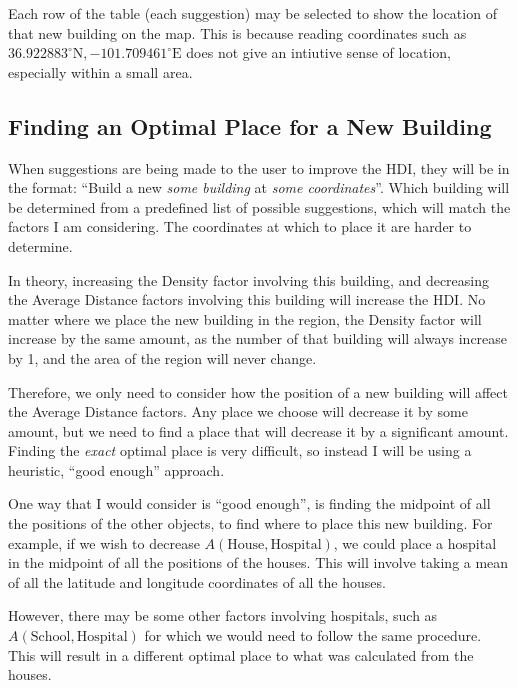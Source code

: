 \documentclass[12pt]{report}
\begin{document}
Each row of the table (each suggestion) may be selected to show the location of that new building on the map. This is because reading coordinates such as $36.922883^{\circ}\text{N},-101.709461^{\circ}\text{E}$ does not give an intiutive sense of location, especially within a small area.

\subsection{Finding an Optimal Place for a New Building}\label{sec:optimalPlace}
When suggestions are being made to the user to improve the HDI, they will be in the format: ``Build a new \textit{some building} at \textit{some coordinates}''. Which building will be determined from a predefined list of possible suggestions, which will match the factors I am considering. The coordinates at which to place it are harder to determine.

In theory, increasing the Density factor involving this building, and decreasing the Average Distance factors involving this building will increase the HDI. No matter where we place the new building in the region, the Density factor will increase by the same amount, as the number of that building will always increase by 1, and the area of the region will never change.

Therefore, we only need to consider how the position of a new building will affect the Average Distance factors. Any place we choose will decrease it by some amount, but we need to find a place that will decrease it by a significant amount. Finding the \textit{exact} optimal place is very difficult, so instead I will be using a heuristic, ``good enough'' approach.

One way that I would consider is ``good enough'', is finding the midpoint of all the positions of the other objects, to find where to place this new building. For example, if we wish to decrease $A\left(\text{House},\text{Hospital}\right)$, we could place a hospital in the midpoint of all the positions of the houses. This will involve taking a mean of all the latitude and longitude coordinates of all the houses.

However, there may be some other factors involving hospitals, such as $A\left(\text{School},\text{Hospital}\right)$ for which we would need to follow the same procedure. This will result in a different optimal place to what was calculated from the houses.
\end{document}
